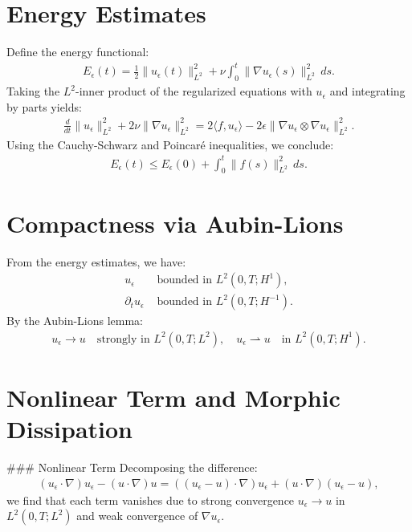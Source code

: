 \documentclass[12pt]{article}
\begin{document}
\section{Energy Estimates}
Define the energy functional:
\begin{align}
    E_\epsilon(t) = \frac{1}{2}\|u_\epsilon(t)\|_{L^2}^2 + \nu \int_0^t \|\nabla u_\epsilon(s)\|_{L^2}^2 \, ds.
\end{align}
Taking the $L^2$-inner product of the regularized equations with $u_\epsilon$ and integrating by parts yields:
\begin{align}
    \frac{d}{dt} \|u_\epsilon\|_{L^2}^2 + 2\nu \|\nabla u_\epsilon\|_{L^2}^2 = 2\langle f, u_\epsilon \rangle - 2\epsilon \|\nabla u_\epsilon \otimes \nabla u_\epsilon\|_{L^2}^2.
\end{align}
Using the Cauchy-Schwarz and Poincar\'e inequalities, we conclude:
\begin{align}
    E_\epsilon(t) \leq E_\epsilon(0) + \int_0^t \|f(s)\|_{L^2}^2 \, ds.
\end{align}

\section{Compactness via Aubin-Lions}
From the energy estimates, we have:
\begin{align}
    u_\epsilon &\text{ bounded in } L^2(0, T; H^1), \\
    \partial_t u_\epsilon &\text{ bounded in } L^2(0, T; H^{-1}).
\end{align}
By the Aubin-Lions lemma:
\begin{align}
    u_\epsilon \to u \quad \text{strongly in } L^2(0, T; L^2), \quad u_\epsilon \rightharpoonup u \quad \text{in } L^2(0, T; H^1).
\end{align}

\section{Nonlinear Term and Morphic Dissipation}
### Nonlinear Term
Decomposing the difference:
\begin{align}
    (u_\epsilon \cdot \nabla)u_\epsilon - (u \cdot \nabla)u = ((u_\epsilon - u) \cdot \nabla)u_\epsilon + (u \cdot \nabla)(u_\epsilon - u),
\end{align}
we find that each term vanishes due to strong convergence $u_\epsilon \to u$ in $L^2(0, T; L^2)$ and weak convergence of $\nabla u_\epsilon$.
\end{document}
